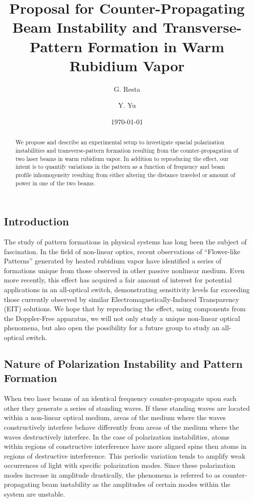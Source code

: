 \documentclass[aps,twocolumn,secnumarabic,balancelastpage,amsmath,amssymb,nofootinbib]{revtex4}
\begin{document}
\title{Proposal for Counter-Propagating Beam Instability and Transverse-Pattern Formation in Warm Rubidium Vapor}
\author{G. Resta}
\author{Y. Yu}
\date{\today}

\begin{abstract}
We propose and describe an experimental setup to investigate spacial polarization instabilities and transverse-pattern formation resulting from the counter-propagation of two laser beams in warm rubidium vapor. In addition to reproducing the effect, our intent is to quantify variations in the pattern as a function of frequency and beam profile inhomogeneity resulting from either altering the distance traveled or amount of power in one of the two beams. 
\end{abstract}

\maketitle
\subsection*{Introduction}
The study of pattern formations in physical systems has long been the subject of fascination. 
In the field of non-linear optics, recent observations of ``Flower-like Patterns'' generated by heated rubidium vapor have identified a series of formations unique from those observed in other passive nonlinear medium\cite{grynberg93}. Even more recently, this effect has acquired a fair amount of interest for potential applications in an all-optical switch, demonstrating sensitivity levels far exceeding those currently observed by similar Electromagnetically-Induced Transparency (EIT) solutions\cite{duke01}. We hope that by reproducing the effect, using components from the Doppler-Free apparatus, we will not only study a unique non-linear optical phenomena, but also open the possibility for a future group to study an all-optical switch.

\subsection*{Nature of Polarization Instability and Pattern Formation}
When two laser beams of an identical frequency counter-propagate upon each other they generate a series of standing waves. If these standing waves are located within a non-linear optical medium, areas of the medium where the waves constructively interfere behave differently from areas of the medium where the waves destructively interfere. In the case of polarization instabilities, atoms within regions of constructive interference have more aligned spins then atoms in regions of destructive interference. This periodic variation tends to amplify weak occurrences of light with specific polarization modes. Since these polarization modes increase in amplitude drastically, the phenomena is referred to as counter-propagating beam instability as the amplitudes of certain modes within the system are unstable.
\end{document}
